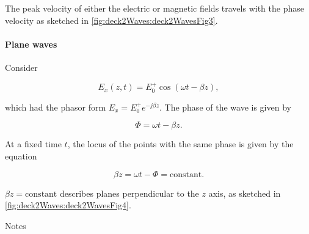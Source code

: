 The peak velocity of either the electric or magnetic fields travels with the phase velocity as sketched in \cref{fig:deck2Waves:deck2WavesFig3}.


\paragraph{Plane waves}

Consider 

\begin{equation}\label{eqn:uwavesLecture2:1040}
E_x(z, t) = E_0^{+} \cos(\omega t - \beta z),
\end{equation}

which had the phasor form \( E_x = E_0^{+} e^{-j \beta z} \).  The phase of the wave is given by

\begin{equation}\label{eqn:uwavesLecture2:1060}
\Phi = \omega t - \beta z.
\end{equation}

At a fixed time \( t \), the locus of the points with the same phase is given by the equation 

\begin{equation}\label{eqn:uwavesLecture2:1080}
\beta z = \omega t - \Phi = \textrm{constant}.
\end{equation}

\( \beta z = \textrm{constant} \) describes planes perpendicular to the \( z \) axis, as sketched in \cref{fig:deck2Waves:deck2WavesFig4}.


Notes

